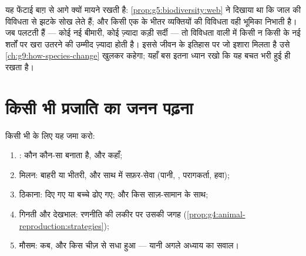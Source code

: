 \begin{remark}[विविधता ही प्रजाति की बचत है]\label{rem:g8:sexual-reproduction:reserve}
यह फेंटाई बाग़ से आगे क्यों मायने रखती है:
\cref{prop:g5:biodiversity:web} ने दिखाया था कि जाल  की
विविधता से झटके सोख लेते हैं; और किसी एक  के भीतर व्यक्तियों की
विविधता वही भूमिका निभाती है। जब  पलटती हैं --- कोई नई
बीमारी, कोई ज़्यादा कड़ी सर्दी --- तो विविधता वाली  में किसी न
किसी के नई शर्तों पर खरा उतरने की उम्मीद ज़्यादा होती है। इससे जीवन के
इतिहास पर जो इशारा मिलता है उसे \cref{ch:g9:how-species-change} खुलकर
कहेगा; यहाँ बस इतना ध्यान रखो कि यह बचत भरी हुई  ही रखता है।
\end{remark}

\section{किसी भी प्रजाति का जनन पढ़ना}

\begin{method}[जनन की मिसल]\label{met:g8:sexual-reproduction:dossier}
किसी भी  के लिए यह जमा करो:
\begin{enumerate}
  \item {}: कौन कौन-सा बनाता है, और कहाँ;
  \item मिलन: बाहरी  या भीतरी, और साथ में सफ़र-सेवा (पानी,
        , परागकर्ता, हवा);
  \item ठिकाना:  दिए गए या बच्चे ढोए गए; और किस साज़-सामान के
        साथ;
  \item गिनती और देखभाल: रणनीति की लकीर पर उसकी जगह
        (\cref{prop:g4:animal-reproduction:strategies});
  \item मौसम: कब, और किस चीज़ से सधा हुआ --- यानी अगले अध्याय का
        सवाल।
\end{enumerate}
\end{method}

